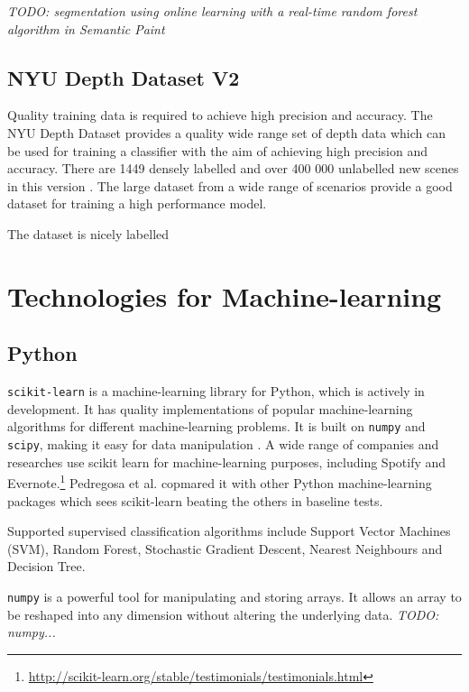 \documentclass[lit_review.tex]{subfiles}
\begin{document}
\textit{TODO: segmentation using online learning with a real-time random forest algorithm in Semantic Paint \cite{semantic-paint}}

\subsection{NYU Depth Dataset V2}
Quality training data is required to achieve high precision and accuracy. The NYU Depth Dataset provides a quality wide range set of depth data which can be used for training a classifier with the aim of achieving high precision and accuracy. There are 1449 densely labelled and over 400 000 unlabelled new scenes in this version \cite{nyu-dataset}. The large dataset from a wide range of scenarios provide a good dataset for training a high performance model.

The dataset is nicely labelled


\newpage

\section{Technologies for Machine-learning}
\subsection{Python}
\texttt{scikit-learn} is a machine-learning library for Python, which is actively in development. It has quality implementations of popular machine-learning algorithms for different machine-learning problems. It is built on \texttt{numpy} and \texttt{scipy}, making it easy for data manipulation \cite{scikit-learn-paper}. A wide range of companies and researches use scikit learn for machine-learning purposes, including Spotify and Evernote.\footnote{\url{http://scikit-learn.org/stable/testimonials/testimonials.html}} Pedregosa et al. \cite{scikit-learn-paper} copmared it with other Python machine-learning packages which sees scikit-learn beating the others in baseline tests.

Supported supervised classification algorithms include Support Vector Machines (SVM), Random Forest, Stochastic Gradient Descent, Nearest Neighbours and Decision Tree. 

\texttt{numpy} is a powerful tool for manipulating and storing arrays. It allows an array to be reshaped into any dimension without altering the underlying data. 
\textit{TODO: numpy...}
\end{document}
